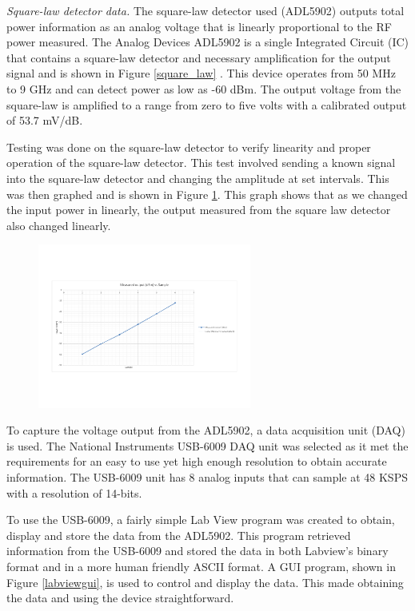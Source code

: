 \emph{Square-law detector data.}  The square-law detector used (ADL5902) outputs total power information as an analog voltage that is linearly proportional to the RF power measured.  The Analog Devices ADL5902 is a single Integrated Circuit (IC) that contains a square-law detector and necessary amplification for the output signal and is shown in Figure \ref{square_law} .  This device operates from 50 MHz to 9 GHz and can detect power as low as -60 dBm.  The output voltage from the square-law is amplified to a range from zero to five volts with a calibrated output of 53.7 mV/dB.  

Testing was done on the square-law detector to verify linearity and proper operation of the square-law detector.  This test involved sending a known signal into the square-law detector and changing the amplitude at set intervals.  This was then graphed and is shown in Figure \ref{square_law_linear}.  This graph shows that as we changed the input power in linearly, the output measured from the square law detector also changed linearly.

{\begin{figure}[h!tb] \centering
\includegraphics[width=7cm]{Images/square_law_linear.pdf}
\label{square_law_linear}
\end{figure}
}

To capture the voltage output from the ADL5902, a data acquisition unit (DAQ) is used.  The National Instruments USB-6009 DAQ unit was selected as it met the requirements for an easy to use yet high enough resolution to obtain accurate information.  The USB-6009 unit has 8 analog inputs that can sample at 48 KSPS with a resolution of 14-bits.  

To use the USB-6009, a fairly simple Lab View program was created to obtain, display and store the data from the ADL5902.  This program retrieved information from the USB-6009 and stored the data in both Labview's binary format and in a more human friendly ASCII format.  A GUI program, shown in Figure \ref{labviewgui}, is used to control and display the data.  This made obtaining the data and using the device straightforward.

